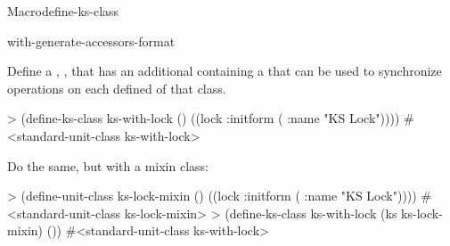 \documentclass[10pt,twoside,english,pdftex]{article}
\begin{document}
\begin{functiondoc}{Macro}{define-ks-class}
\begin{alsos}{with-generate-accessors-format}
\also[define-ks]
\end{alsos}

\fnexamples
Define a ,
, that has an additional 
containing a  that can be used to synchronize
operations on each defined  of that class.
%
\W\supp
\begin{example}
> (define-ks-class ks-with-lock ()
    ((lock :initform ( :name "KS Lock"))))
#<standard-unit-class ks-with-lock>
\end{example}
%
Do the same, but with a mixin class:
%
\W\supp\notpretop
\begin{example}
> (define-unit-class ks-lock-mixin ()
    ((lock :initform ( :name "KS Lock"))))
#<standard-unit-class ks-lock-mixin>
> (define-ks-class ks-with-lock (ks ks-lock-mixin)
    ())
#<standard-unit-class ks-with-lock>
\end{example}

\end{functiondoc}

\end{document}
